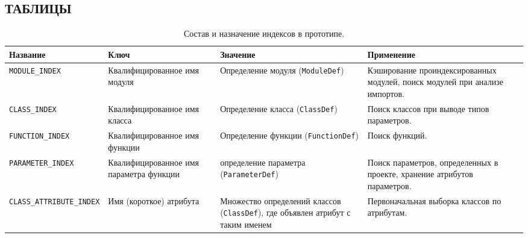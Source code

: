 
\begin{turn}{90}
  \begin{minipage}{0.69\paperheight}
    \chapter{ТАБЛИЦЫ}
    \label{app:tables}
    \begin{table}[H]
      \small
      \caption{Состав и назначение индексов в прототипе.}
      \label{tab:indexes-ref}
      \begin{tabularx}{\textwidth}{ |X|X|X|X| }
        \hline
        Название & Ключ & Значение & Применение \\
        \hline
        \texttt{MODULE\_INDEX} & Квалифицированное имя модуля & Определение модуля
        (\texttt{ModuleDef})
        &  Кэширование проиндексированных модулей, поиск модулей при анализе импортов.
        \\ \hline

        \texttt{CLASS\_INDEX} & Квалифицированное имя класса & Определение класса
        (\texttt{ClassDef})
        & Поиск классов при выводе типов параметров. \\ \hline 

        \texttt{FUNCTION\_INDEX} & Квалифицированное имя функции & Определение функции
        (\texttt{FunctionDef}) & Поиск функций. \\ \hline

        \texttt{PARAMETER\_INDEX} & Квалифицированное имя параметра функции & определение
        параметра (\texttt{ParameterDef}) & Поиск параметров, определенных в проекте,
        хранение атрибутов параметров. \\ \hline

        \texttt{CLASS\_ATTRIBUTE\_INDEX} & Имя (короткое) атрибута & Множество
        определений классов (\texttt{ClassDef}), где 
        объявлен атрибут с таким именем & Первоначальная выборка классов по атрибутам.
        \\ \hline

      \end{tabularx}
    \end{table}
  \end{minipage}
\end{turn}



